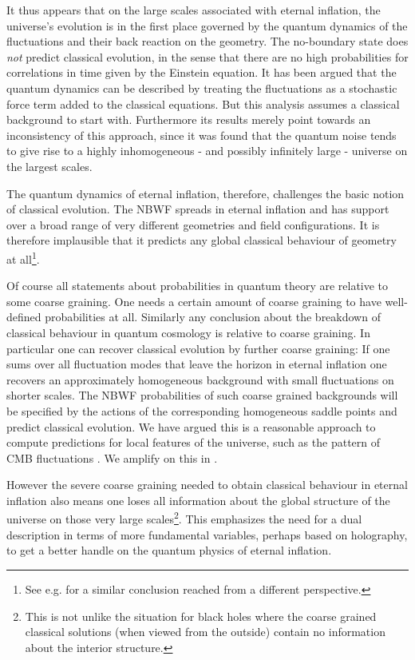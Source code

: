 \documentclass[prd,floats,superscriptaddress,eqsecnum,floatfix,nofootinbib,12pt]{revtex4}
\def\rf{}
\def\mf{}
\def\rf{}
\def\uf{}
\begin{document}
{{{{It thus appears that on the large scales associated with eternal inflation, the universe's evolution is in the first place governed by the quantum dynamics of the fluctuations and their back reaction on the geometry. The no-boundary state does {\it not} predict classical evolution, in the sense that there are no high probabilities for correlations in time given by the Einstein equation. It has been argued \cite{Star86,Linde96,Gratton05} that the quantum dynamics 
can be described by treating the fluctuations as a stochastic force term added to the classical equations. But this analysis assumes a classical background to start with. Furthermore its results merely point towards an inconsistency of this approach, since it was found that the quantum noise tends to give rise to a highly inhomogeneous - and possibly infinitely large - universe on the largest scales.

The quantum dynamics of eternal inflation, therefore, challenges the basic notion of classical evolution. The NBWF spreads in eternal inflation and has support over a broad range of very different geometries and field configurations. It is therefore implausible that it predicts {\mf any global} classical behaviour of geometry at all\footnote{See e.g. \cite{Dvali14} for a similar conclusion reached from a different perspective.}. 

Of course all statements about probabilities in quantum theory are relative to some coarse graining. One needs a certain amount of coarse graining to have well-defined probabilities at all. Similarly any conclusion about the breakdown of classical behaviour in quantum
{\rf cosmology} is relative to coarse graining. In particular one can recover classical evolution by further coarse graining: If one sums over all fluctuation modes that leave the horizon in eternal inflation one recovers an approximately homogeneous background with small fluctuations on shorter scales. The NBWF probabilities of such coarse grained backgrounds will be specified by the actions of the corresponding homogeneous saddle points and predict classical evolution. We have argued this is a reasonable approach to compute predictions for local features of the universe, such as the pattern of CMB fluctuations \cite{HHH10b}. {\uf We amplify on this in \cite{HH15c}.}

However the severe coarse graining needed to obtain classical behaviour in eternal inflation also means one loses all information about the global structure of the universe on those very large scales\footnote{This is not unlike the situation for black holes where the coarse grained classical solutions (when viewed from the outside) contain no information about the interior structure.}. This emphasizes the need for a dual description in terms of more fundamental variables, perhaps based on holography, to get a better handle on the quantum physics of eternal inflation. 


}}}}
\end{document}
